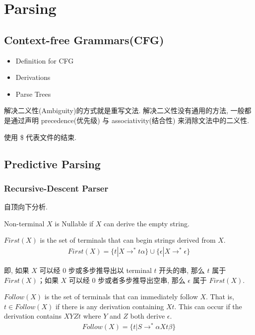 \section{Parsing}
\subsection{Context-free Grammars(CFG)}
\begin{itemize}
    \item Definition for CFG %
    \item Derivations %
    \item Parse Trees %
\end{itemize}


解决二义性(Ambiguity)的方式就是重写文法. 解决二义性没有通用的方法, 一般都是通过声明 precedence(优先级) 与 associativity(结合性) 来消除文法中的二义性.

使用 \$ 代表文件的结束. 

\subsection{Predictive Parsing}
\subsubsection{Recursive-Descent Parser}
自顶向下分析.

\begin{definition}[Nullable]
    Non-terminal $X$ is Nullable if $X$ can derive the empty string.
\end{definition}

\begin{definition}
    $First(X)$ is the set of terminals that can begin strings derived from $X$.
    \begin{align*}
        First(X)=\{ t|X\to^*t\alpha \}\cup\{ \epsilon | X\to^*\epsilon \}
    \end{align*}
\end{definition}
即, 如果 $X$ 可以经 0 步或多步推导出以 terminal $t$ 开头的串, 那么 $t$ 属于 ${First}(X)$；如果 $X$ 可以经 0 步或者多步推导出空串, 那么 $\epsilon$ 属于 ${First}(X)$. 

\begin{definition}
    $Follow(X)$ is the set of terminals that can immediately follow $X$. That is, $t \in Follow(X)$ if there is any derivation containing $Xt$. This can occur if the derivation contains $XYZt$ where $Y$ and $Z$ both derive $\epsilon$.
    \begin{align*}
        Follow(X)=\{ t|S\to^*\alpha Xt\beta \}
    \end{align*}
\end{definition}

